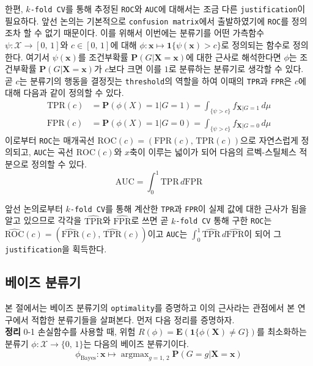 \documentclass[10pt,onecolumn,twoside,a4size]{gsag3jnl}
\DeclareMathOperator*{\argmax}{argmax}
\begin{document}
한편, \texttt{$k$-fold CV}를 통해 추정된 \texttt{ROC}와 \texttt{AUC}에 대해서는 조금 다른 \texttt{justification}이 필요하다. 앞선 논의는 기본적으로 \texttt{confusion matrix}에서 출발하였기에 \texttt{ROC}를 정의조차 할 수 없기 때문이다. 이를 위해서 이번에는 분류기를 어떤 가측함수 $\psi:\mathcal{X}\to[0,\,1]$와 $c\in[0,\,1]$에 대해 $\phi:\mathbf{x}\mapsto\mathbf{1}\{\psi(\mathbf{x})>c\}$로 정의되는 함수로 정의한다. 여기서 $\psi(\mathbf{x})$를 조건부확률 $\mathbf{P}(G\vert \mathbf{X}=\mathbf{x})$에 대한 근사로 해석한다면 $\phi$는 조건부확률 $\mathbf{P}(G\vert \mathbf{X}=\mathbf{x})$가 $c$보다 크면 이를 $1$로 분류하는 분류기로 생각할 수 있다. 곧 $c$는 분류기의 행동을 결정짓는 \texttt{threshold}의 역할을 하여 이때의 \texttt{TPR}과 \texttt{FPR}은 $c$에 대해 다음과 같이 정의할 수 있다.
\begin{align}
  \mathrm{TPR}(c)&=\mathbf{P}(\phi(X)=1\vert G=1)=\int_{\{\psi>c\}} f_{\mathbf{X}\vert G=1}\,d\mu\\
  \mathrm{FPR}(c)&=\mathbf{P}(\phi(X)=1\vert G=0)=\int_{\{\psi>c\}} f_{\mathbf{X}\vert G=0}\,d\mu
\end{align}
이로부터 \texttt{ROC}는 매개곡선 $\mathrm{ROC}(c)=(\mathrm{FPR}(c),\,\mathrm{TPR}(c))$으로 자연스럽게 정의되고, \texttt{AUC}는 곡선 $\mathrm{ROC}(c)$와 $x$축이 이루는 넓이가 되어 다음의 르벡-스틸체스 적분으로 정의할 수 있다.
\begin{equation}
  \mathrm{AUC}=\int_0^1\mathrm{TPR}\,d\mathrm{FPR}
\end{equation}

앞선 논의로부터 \texttt{$k$-fold CV}를 통해 계산한 \texttt{TPR}과 \texttt{FPR}이 실제 값에 대한 근사가 됨을 알고 있으므로 각각을 $\widehat{\mathrm{TPR}}$와 $\widehat{\mathrm{FPR}}$로 쓰면 곧 \texttt{$k$-fold CV} 통해 구한 \texttt{ROC}는 $\widehat{\mathrm{ROC}}(c)=(\widehat{\mathrm{FPR}}(c),\,\widehat{\mathrm{TPR}}(c))$이고 \texttt{AUC}는 $\int_0^1\widehat{\mathrm{TPR}}\,d\widehat{\mathrm{FPR}}$이 되어 그 \texttt{justification}을 획득한다.

\subsection{베이즈 분류기}

본 절에서는 베이즈 분류기의 \texttt{optimality}를 증명하고 이의 근사라는 관점에서 본 연구에서 적합한 분류기들을 살펴본다. 먼저 다음 정리를 증명하자.\\

\noindent\textsf{\textbf{정리} 0-1 손실함수를 사용할 때, 위험 $R(\phi)=\mathbf{E}(\mathbf{1}\{\phi(\mathbf{X})\ne G\})$를 최소화하는 분류기 $\phi:\mathcal{X}\to\{0,\,1\}$는 다음의 베이즈 분류기이다.
\begin{equation}\label{eq:Bayes}
  \phi_\mathrm{Bayes}:\mathbf{x}\mapsto\argmax_{g=1,\,2}\mathbf{P}(G=g\vert\mathbf{X}=\mathbf{x})
\end{equation}}
\end{document}
